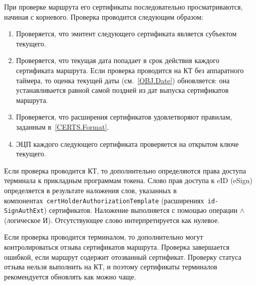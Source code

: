 При проверке маршрута его сертификаты последовательно просматриваются, начиная 
с корневого. Проверка проводится следующим образом:
\begin{enumerate}
\item
Проверяется, что эмитент следующего сертификата является субъектом текущего.

\item
Проверяется, что текущая дата попадает в срок действия каждого сертификата маршрута. 
Если проверка проводится на КТ без аппаратного таймера, то оценка текущей даты 
(см.~\ref{OBJ.Date}) обновляется: она устанавливается равной самой поздней из дат 
выпуска сертификатов маршрута.

\item
Проверяется, что расширения сертификатов удовлетворяют правилам,
заданным в~\ref{CERTS.Format}.

\item
ЭЦП каждого следующего сертификата проверяется на открытом ключе текущего.
\end{enumerate}

Если проверка проводится КТ, то дополнительно определяются права доступа
терминала к прикладным программам токена. Слово прав доступа к eID (eSign) 
определяется в результате наложения слов, указанных в
компонентах~\texttt{certHolderAuthorizationTemplate} 
(расширениях~\texttt{id-SignAuthExt}) сертификатов.
%
Наложение выполняется с помощью операции $\wedge$ (логическое И). 
Отсутствующее слово интерпретируется как нулевое.

Если проверка проводится терминалом, то дополнительно могут контролироваться
 отзыва сертификатов маршрута. Проверка завершается ошибкой, если 
маршрут содержит отозванный сертификат. 
%
Проверку статуса отзыва нельзя выполнить на КТ, и поэтому сертификаты 
терминалов рекомендуется обновлять как можно чаще.


